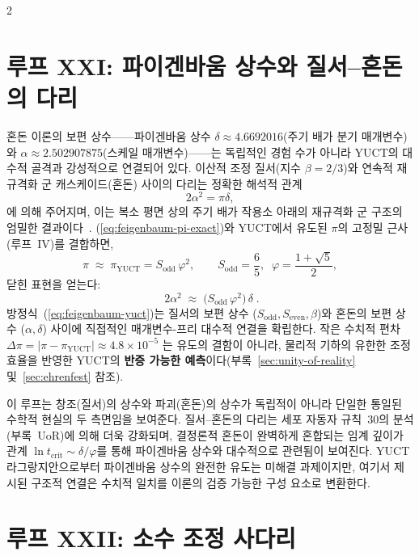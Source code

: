 \documentclass[12pt,a4paper]{article}
\begin{document}
\begin{multicols}{2}
		\section{루프 XXI: 파이겐바움 상수와 질서–혼돈의 다리}
		
		혼돈 이론의 보편 상수——파이겐바움 상수
		\(\delta \approx 4.6692016\)(주기 배가 분기 매개변수)와
		\(\alpha \approx 2.502907875\)(스케일 매개변수)——는 독립적인 경험 수가 아니라 YUCT의 대수적 골격과 강성적으로 연결되어 있다.
		이산적 조정 질서(지수 \(\beta=2/3\))와 연속적 재규격화 군 캐스케이드(혼돈) 사이의 다리는 정확한 해석적 관계
		\begin{equation}
			2\alpha^2 = \pi \delta,
			\label{eq:feigenbaum-pi-exact}
		\end{equation}
		에 의해 주어지며, 이는 복소 평면 상의 주기 배가 작용소 아래의 재규격화 군 구조의 엄밀한 결과이다~\cite{Feigenbaum1978}.
		(\ref{eq:feigenbaum-pi-exact})와 YUCT에서 유도된 \(\pi\)의 고정밀 근사(루프~IV)를 결합하면,
		\begin{equation}
			\pi \;\approx\; \pi_{\mathrm{YUCT}} = S_{\mathrm{odd}}\,\varphi^2,
			\qquad
			S_{\mathrm{odd}} = \frac{6}{5},\;\; \varphi = \frac{1+\sqrt{5}}{2},
		\end{equation}
		닫힌 표현을 얻는다:
		\begin{equation}
			\boxed{\;
				2\alpha^2 \;\approx\; \bigl(S_{\mathrm{odd}}\,\varphi^2\bigr)\,\delta
				\;}.
			\label{eq:feigenbaum-yuct}
		\end{equation}
		방정식~(\ref{eq:feigenbaum-yuct})는 질서의 보편 상수 (\(S_{\mathrm{odd}}, S_{\mathrm{even}}, \beta\))와 혼돈의 보편 상수 (\(\alpha, \delta\)) 사이에 직접적인 매개변수-프리 대수적 연결을 확립한다. 작은 수치적 편차
		\(\Delta\pi = |\pi - \pi_{\mathrm{YUCT}}| \approx 4.8\times10^{-5}\)
		는 유도의 결함이 아니라, 물리적 기하의 유한한 조정 효율을 반영한 YUCT의 \textbf{반증 가능한 예측}이다(부록~\ref{sec:unity-of-reality} 및~\ref{sec:ehrenfest} 참조).
		
		이 루프는 창조(질서)의 상수와 파괴(혼돈)의 상수가 독립적이 아니라 단일한 통일된 수학적 현실의 두 측면임을 보여준다. 질서–혼돈의 다리는 세포 자동자 규칙~30의 분석(부록~UoR)에 의해 더욱 강화되며, 결정론적 혼돈이 완벽하게 혼합되는 임계 깊이가 관계 \(\ln t_{\mathrm{crit}} \sim \delta/\varphi\)를 통해 파이겐바움 상수와 대수적으로 관련됨이 보여진다. YUCT 라그랑지안으로부터 파이겐바움 상수의 완전한 유도는 미해결 과제이지만, 여기서 제시된 구조적 연결은 수치적 일치를 이론의 검증 가능한 구성 요소로 변환한다.
		
		\section{루프 XXII: 소수 조정 사다리}
		

\end{multicols}
\end{document}
